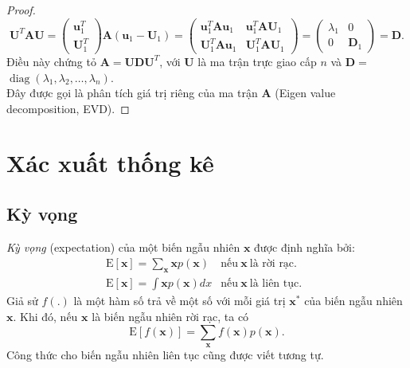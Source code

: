 \documentclass[12pt,a4paper,oneside]{report}
\numberwithin{equation}{section}
\begin{document}
\begin{proof}
	$$
	\mathbf{U}^{T} \mathbf{A} \mathbf{U}=\left(\begin{array}{c}
		\mathbf{u}_{1}^{T} \\
		\mathbf{U}_{1}^{T}
	\end{array}\right) \mathbf{A}\left(\mathbf{u}_{1}-\mathbf{U}_{1}\right)=\left(\begin{array}{cc}
		\mathbf{u}_{1}^{T} \mathbf{A} \mathbf{u}_{1} & \mathbf{u}_{1}^{T} \mathbf{A} \mathbf{U}_{1} \\
		\mathbf{U}_{1}^{T} \mathbf{A} \mathbf{u}_{1} & \mathbf{U}_{1}^{T} \mathbf{A} \mathbf{U}_{1}
	\end{array}\right)=\left(\begin{array}{cc}
		\lambda_{1} & 0 \\
		0 & \mathbf{D}_{1}
	\end{array}\right)=\mathbf{D} .
	$$
	Điều này chứng tỏ $\mathbf{A}=\mathbf{U D U}^{T}$, với $\mathbf{U}$ là ma trận trực giao cấp $n$ và $\mathbf{D}=$ $\operatorname{diag}\left(\lambda_{1}, \lambda_{2}, \ldots, \lambda_{n}\right).$\\
	Đây được gọi là phân tích giá trị riêng của ma trận $\mathbf{A}$ (Eigen value decomposition, EVD). 
\end{proof}
\section{Xác xuất thống kê}
\subsection{Kỳ vọng}
\label{sub:expectaion_covariance}
\textit{Kỳ vọng} (expectation) của một biến ngẫu nhiên $\mathbf{x}$ được định nghĩa bởi:
	\begin{eqnarray}
		\label{eqn:30_21}
		\text{E}[\mathbf{x}] = \sum_ \mathbf{x} \mathbf{x} p(\mathbf{x})  & \text{nếu}~\mathbf{ x} ~ \text{là rời rạc.} \quad
		\\
		\label{eqn:30_22}
		\text{E}[\mathbf{x}] = \int \mathbf{x} p(\mathbf{x}) dx  & \text{nếu}~ \mathbf{x} ~ \text{là liên tục.}
	\end{eqnarray}
Giả sử $f(.)$ là một hàm số trả về một số với mỗi giá trị $\mathbf{x^*}$ của biến ngẫu
nhiên $\mathbf{x}$. Khi đó, nếu $\mathbf{x}$ là biến ngẫu nhiên rời rạc, ta có
\begin{equation}
	\label{eqn:30_23}
	\text{E}[f(\mathbf{x})] = \sum_\mathbf{x} f(\mathbf{x}) p(\mathbf{x}).
\end{equation}
Công thức cho biến ngẫu nhiên liên tục cũng được viết tương tự.
\end{document}
